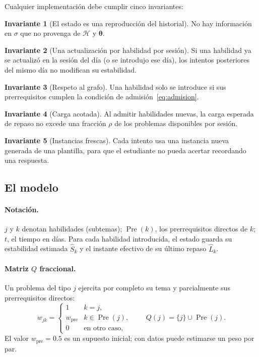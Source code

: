 \documentclass[12pt]{article}
\theoremstyle{definition}
\newtheorem{invariante}{Invariante}
\newcommand{\Pre}{\operatorname{Pre}}
\newcommand{\Sh}{\hat S}
\newcommand{\Lh}{\hat L}
\newcommand{\Hist}{\mathcal H}
\begin{document}
Cualquier implementación debe cumplir cinco invariantes:

\begin{invariante}[El estado es una reproducción del historial] No hay información en $\sigma$ que no provenga de $\Hist$ y $\bm\theta$.\end{invariante}
\begin{invariante}[Una actualización por habilidad por sesión] Si una habilidad ya se actualizó en la sesión del día (o se introdujo ese día), los intentos posteriores del mismo día no modifican su estabilidad.\end{invariante}
\begin{invariante}[Respeto al grafo] Una habilidad solo se introduce si sus prerrequisitos cumplen la condición de admisión~\eqref{eq:admision}.\end{invariante}
\begin{invariante}[Carga acotada] Al admitir habilidades nuevas, la carga esperada de repaso no excede una fracción $\rho$ de los problemas disponibles por sesión.\end{invariante}
\begin{invariante}[Instancias frescas] Cada intento usa una instancia nueva generada de una plantilla, para que el estudiante no pueda acertar recordando una respuesta.\end{invariante}

\subsection{El modelo}
\label{sec:modelo}

\paragraph{Notación.} $j$ y $k$ denotan habilidades (subtemas); $\Pre(k)$, los prerrequisitos directos de $k$; $t$, el tiempo en días. Para cada habilidad introducida, el estado guarda su estabilidad estimada $\Sh_k$ y el instante efectivo de su último repaso $\Lh_k$.

\paragraph{Matriz $Q$ fraccional.} Un problema del tipo $j$ ejercita por completo su tema y parcialmente sus prerrequisitos directos:
\begin{equation}
w_{jk}=\begin{cases}1 & k=j,\\ w_{\mathrm{pre}} & k\in\Pre(j),\\ 0 & \text{en otro caso,}\end{cases}
\qquad Q(j)=\{j\}\cup\Pre(j).
\label{eq:pesos}
\end{equation}
El valor $w_{\mathrm{pre}}=0.5$ es un supuesto inicial; con datos puede estimarse un peso por par.
\end{document}
